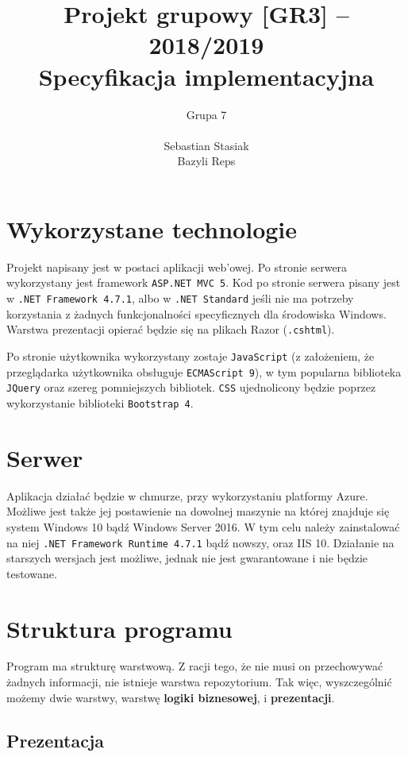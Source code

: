 \documentclass[a4paper, 10pt, titlepage]{article}
\title {Projekt grupowy [GR3] -- 2018/2019\\Specyfikacja implementacyjna}
\author{Grupa 7 \\\\ Sebastian Stasiak \\ Bazyli Reps}
\newcommand{\code}[1]{\texttt{#1}}
\begin{document}
\maketitle
\tableofcontents
\newpage

\section{Wykorzystane technologie}

Projekt napisany jest w postaci aplikacji web'owej.
Po stronie serwera wykorzystany jest framework \code{ASP.NET MVC 5}. Kod po stronie serwera pisany jest w \code{.NET Framework 4.7.1}, albo w \code{.NET Standard} jeśli nie ma potrzeby korzystania z żadnych funkcjonalności specyficznych dla środowiska Windows.
Warstwa prezentacji opierać będzie się na plikach Razor (\code{.cshtml}).

Po stronie użytkownika wykorzystany zostaje \code{JavaScript} (z założeniem, że przeglądarka użytkownika obsługuje \code{ECMAScript 9}), w tym popularna biblioteka \code{JQuery} oraz szereg pomniejszych bibliotek.
\code{CSS} ujednolicony będzie poprzez wykorzystanie biblioteki \code{Bootstrap 4}.

\section{Serwer}

Aplikacja działać będzie w chmurze, przy wykorzystaniu platformy Azure.
Możliwe jest także jej postawienie na dowolnej maszynie na której znajduje się system Windows 10 bądź Windows Server 2016.
W tym celu należy zainstalować na niej \code{.NET Framework Runtime 4.7.1} bądź nowszy, oraz IIS 10.
Działanie na starszych wersjach jest możliwe, jednak nie jest gwarantowane i nie będzie testowane.

\section{Struktura programu}

Program ma strukturę warstwową.
Z racji tego, że nie musi on przechowywać żadnych informacji, nie istnieje warstwa repozytorium.
Tak więc, wyszczególnić możemy dwie warstwy, warstwę \textbf{logiki biznesowej}, i \textbf{prezentacji}.

\subsection{Prezentacja}
\end{document}

